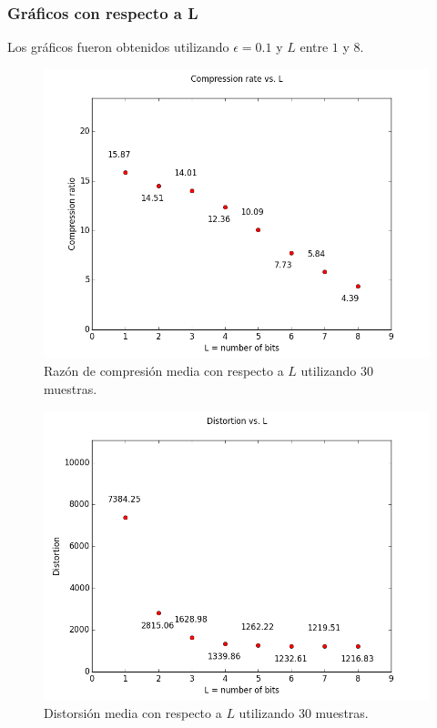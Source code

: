 \documentclass[12pt,a4paper]{article}
\begin{document}
\subsubsection{Gráficos con respecto a L}
Los gráficos fueron obtenidos utilizando $\epsilon = 0.1$ y $L$ entre $1$ y $8$.
\begin{figure}[H]
\centering
\includegraphics[width=1.0\textwidth]{../graphs/compression_ratio_L.png}
\caption{\label{fig:cr_epsilon} Razón de compresión media con respecto a $L$ utilizando 30 muestras.}
\end{figure}

\begin{figure}[H]
\centering
\includegraphics[width=1.0\textwidth]{../graphs/distortion_L.png}
\caption{\label{fig:distortion_L} Distorsión media con respecto a $L$ utilizando 30 muestras.}
\end{figure}
\end{document}
